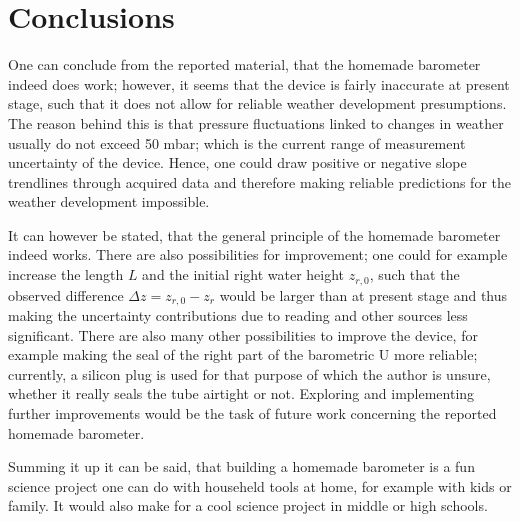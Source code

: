 \documentclass[a4paper,10pt, twocolumn]{article}
\begin{document}
\section{Conclusions}
One can conclude from the reported material, that the homemade barometer indeed does work; however, it seems that the device is fairly inaccurate at present stage, such that it does not allow for reliable weather development presumptions. The reason behind this is that pressure fluctuations linked to changes in weather usually do not exceed 50 mbar; which is the current range of measurement uncertainty of the device. Hence, one could draw positive or negative slope trendlines through acquired data and therefore making reliable predictions for the weather development impossible.

It can however be stated, that the general principle of the homemade barometer indeed works. There are also possibilities for improvement; one could for example increase the length $L$ and the initial right water height $z_{r,0}$, such that the observed difference $\Delta z = z_{r,0}-z_r$ would be larger than at present stage and thus making the uncertainty contributions due to reading and other sources less significant. There are also many other possibilities to improve the device, for example making the seal of the right part of the barometric U more reliable; currently, a silicon plug is used for that purpose of which the author is unsure, whether it really seals the tube airtight or not. Exploring and implementing further improvements would be the task of future work concerning the reported homemade barometer.

Summing it up it can be said, that building a homemade barometer is a fun science project one can do with househeld tools at home, for example with kids or family. It would also make for a cool science project in middle or high schools.

\appendix
\end{document}
